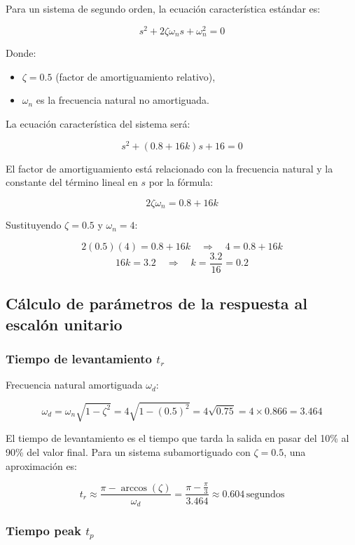 \documentclass[10pt]{article}
\theoremstyle{definition}
\theoremstyle{remark}
\theoremstyle{definition}
\numberwithin{equation}{prob}
\begin{document}
Para un sistema de segundo orden, la ecuación característica estándar es:

\[
	s^2 + 2\zeta \omega_n s + \omega_n^2 = 0
\]

Donde:
\begin{itemize}
	\item \(\zeta = 0.5\) (factor de amortiguamiento relativo),
	\item \(\omega_n\) es la frecuencia natural no amortiguada.
\end{itemize}

La ecuación característica del sistema será:

\[
	s^2 + (0.8 + 16k)s + 16 = 0
\]

El factor de amortiguamiento está relacionado con la frecuencia natural y la constante del término lineal en \(s\) por la fórmula:

\[
	2\zeta \omega_n = 0.8 + 16k
\]

Sustituyendo \(\zeta = 0.5\) y \(\omega_n = 4\):

\[
	2(0.5)(4) = 0.8 + 16k \quad \Rightarrow \quad 4 = 0.8 + 16k
\]
\[
	16k = 3.2 \quad \Rightarrow \quad k = \frac{3.2}{16} = 0.2
\]

\subsection{Cálculo de parámetros de la respuesta al escalón unitario}

\subsubsection{Tiempo de levantamiento \texorpdfstring{\(t_r\)}{tr}}

Frecuencia natural amortiguada \(\omega_d\):

\[
\omega_d = \omega_n \sqrt{1 - \zeta^2} = 4 \sqrt{1 - (0.5)^2} = 4 \sqrt{0.75} = 4 \times 0.866 = 3.464
\]

El tiempo de levantamiento es el tiempo que tarda la salida en pasar del 10\% al 90\% del valor final. Para un sistema subamortiguado con \(\zeta = 0.5\), una aproximación es:

\[
	t_r \approx \frac{\pi - \arccos(\zeta)}{\omega_d} = \frac{\pi - \frac{\pi}{3}}{3.464} \approx 0.604 \, \text{segundos}
\]

\subsubsection{Tiempo peak \texorpdfstring{\(t_p\)}{tp}}
\end{document}
